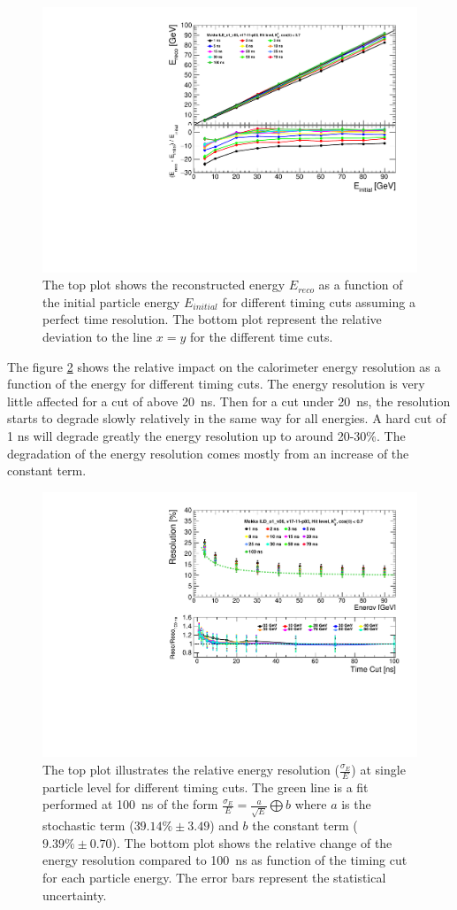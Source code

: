 \begin{figure}[htbp!]
  \centering
  \includegraphics[width=0.6\linewidth]{../Thesis_Plots/ILD/NoSmearing/Plots/Linearity_TimeCuts_noSmearing}
  \caption{The top plot shows the reconstructed energy $E_{reco}$ as a function of the initial particle energy $E_{initial}$ for different timing cuts assuming a perfect time resolution. The bottom plot represent the relative deviation to the line $x=y$ for the different time cuts.} \label{fig:linearityNoSmearing}
\end{figure}

The figure \ref{fig:resoNoSmearing} shows the relative impact on the calorimeter energy resolution as a function of the energy for different timing cuts. The energy resolution is very little affected for a cut of above \SI{20}{\nano\second}. Then for a cut under \SI{20}{\nano\second}, the resolution starts to degrade slowly relatively in the same way for all energies. A hard cut of 1 ns will degrade greatly the energy resolution up to around 20-30\%. The degradation of the energy resolution comes mostly from an increase of the constant term.

\begin{figure}[htbp!]
  \centering
  \includegraphics[width=0.6\linewidth]{../Thesis_Plots/ILD/NoSmearing/Plots/ShowerResoAbsolute_TimeCuts_noSmearing}
  \caption{The top plot illustrates the relative energy resolution ($\frac{\sigma_{E}}{E}$) at single particle level for different timing cuts. The green line is a fit performed at \SI{100}{\nano\second} of the form $\frac{\sigma_{E}}{E} = \frac{a}{\sqrt{E}} \bigoplus b$ where $a$ is the stochastic term ($39.14\% \pm 3.49$) and $b$ the constant term ($9.39\% \pm 0.70$). The bottom plot shows the relative change of the energy resolution compared to \SI{100}{\nano\second} as function of the timing cut for each particle energy. The error bars represent the statistical uncertainty.} \label{fig:resoNoSmearing}
\end{figure}

